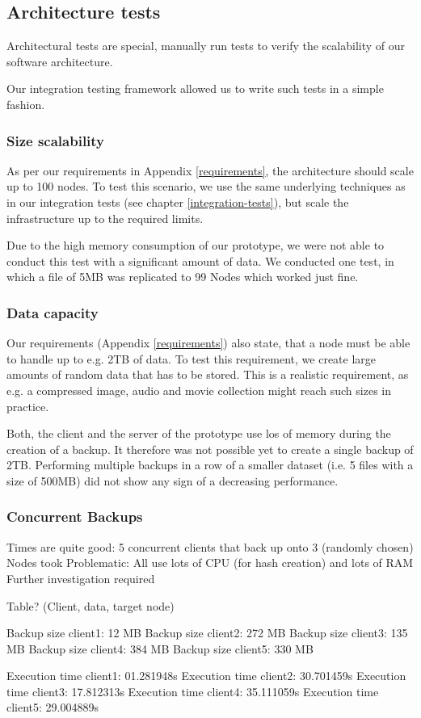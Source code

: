 \subsection{Architecture tests}

Architectural tests are special, manually run tests to verify the scalability of our software architecture.

Our integration testing framework allowed us to write such tests in a simple fashion.

\subsubsection{Size scalability}
As per our requirements in Appendix \ref{requirements}, the architecture should scale up to 100 nodes. To test this scenario, we use the same underlying techniques as in our integration tests (see chapter \ref{integration-tests}), but scale the infrastructure up to the required limits.

Due to the high memory consumption of our prototype, we were not able to conduct this test with a significant amount of data. We conducted one test, in which a file of 5MB was replicated to 99 Nodes which worked just fine.

\subsubsection{Data capacity}
Our requirements (Appendix \ref{requirements}) also state, that a node must be able to handle up to e.g. 2TB of data. To test this requirement, we create large amounts of random data that has to be stored. This is a realistic requirement, as e.g. a compressed image, audio and movie collection might reach such sizes in practice.

Both, the client and the server of the prototype use los of memory during the creation of a backup. It therefore was not possible yet to create a single backup of 2TB. Performing multiple backups in a row of a smaller dataset (i.e. 5 files with a size of 500MB) did not show any sign of a decreasing performance.

\subsubsection{Concurrent Backups}

Times are quite good: 5 concurrent clients that back up onto 3 (randomly chosen) Nodes took
Problematic: All use lots of CPU (for hash creation) and lots of RAM
Further investigation required

Table? (Client, data, target node)

Backup size client1:  12 MB
Backup size client2: 272 MB
Backup size client3: 135 MB
Backup size client4: 384 MB
Backup size client5: 330 MB

Execution time client1: 01.281948s
Execution time client2: 30.701459s
Execution time client3: 17.812313s
Execution time client4: 35.111059s
Execution time client5: 29.004889s